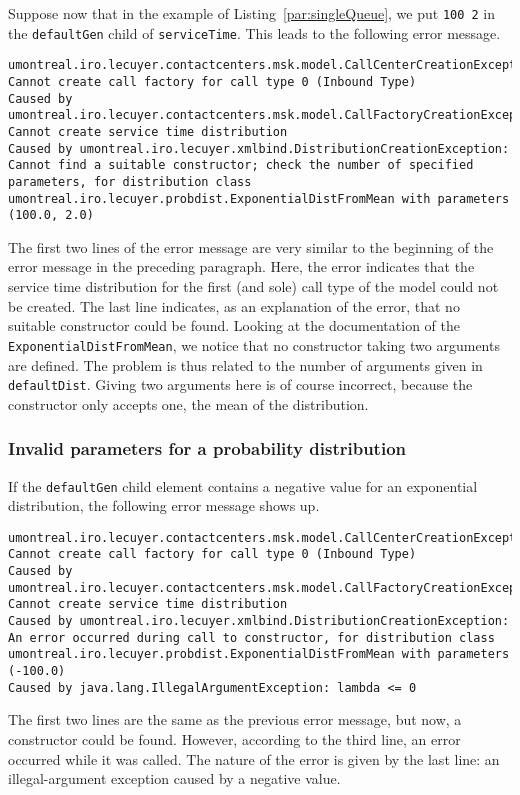 Suppose now that in the example of Listing~\ref{par:singleQueue},
we put \texttt{100 2} in the \texttt{default\-Gen} child of
\texttt{service\-Time}.
This leads to the following error message.
\begin{lstlisting}[language={},breaklines,prebreak={\char92}]
umontreal.iro.lecuyer.contactcenters.msk.model.CallCenterCreationException: Cannot create call factory for call type 0 (Inbound Type)
Caused by umontreal.iro.lecuyer.contactcenters.msk.model.CallFactoryCreationException: Cannot create service time distribution
Caused by umontreal.iro.lecuyer.xmlbind.DistributionCreationException: Cannot find a suitable constructor; check the number of specified parameters, for distribution class umontreal.iro.lecuyer.probdist.ExponentialDistFromMean with parameters (100.0, 2.0)
\end{lstlisting}
The first two lines of the error message are very similar to the
beginning of the error message in the preceding paragraph.
Here, the error indicates that the service time distribution for the
first (and sole) call type of the model could not be created.
The last line indicates, as an explanation of the error, that no
suitable constructor could be found.
Looking at the documentation of the
\texttt{Exponential\-Dist\-From\-Mean}, we notice that no constructor
taking two arguments are defined.
The problem is thus related to the number of arguments given in
\texttt{default\-Dist}.  Giving two arguments here is of course
incorrect, because the constructor only accepts one, the mean of the
distribution.

\subsubsection{Invalid parameters for a probability distribution}

If the \texttt{default\-Gen} child element contains a negative value
for an exponential distribution, the following error message shows up.
\begin{lstlisting}[language={},breaklines,prebreak={\char92}]
umontreal.iro.lecuyer.contactcenters.msk.model.CallCenterCreationException: Cannot create call factory for call type 0 (Inbound Type)
Caused by umontreal.iro.lecuyer.contactcenters.msk.model.CallFactoryCreationException: Cannot create service time distribution
Caused by umontreal.iro.lecuyer.xmlbind.DistributionCreationException: An error occurred during call to constructor, for distribution class umontreal.iro.lecuyer.probdist.ExponentialDistFromMean with parameters (-100.0)
Caused by java.lang.IllegalArgumentException: lambda <= 0
\end{lstlisting}
The first two lines are the same as the previous error message, but
now, a constructor could be found.
However, according to the third line, an error occurred while it was
called.
The nature of the error is given by the last line: an illegal-argument
exception caused by a negative value.

